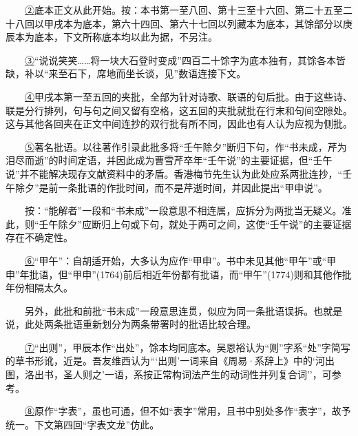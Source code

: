 　　{\hyperref[lnkback_2_a]{②}底本正文从此开始。按：本书第一至八回、第十三至十六回、第二十五至二十八回以甲戌本为底本，第六十四回、第六十七回以列藏本为底本，其馀部分以庚辰本为底本，下文所称底本均以此为据，不另注。}

　　{\href{../Text/part0005_split_000.html\#navto_3_a}{③}``说说笑笑\ldots{}\ldots{}将一块大石登时变成''四百二十馀字为底本独有，其馀各本皆缺，补以``来至石下，席地而坐长谈，见''数语连接下文。}

　　{\href{../Text/part0005_split_000.html\#navto_4_a}{④}甲戌本第一至五回的夹批，全部为针对诗歌、联语的句后批。由于这些诗、联是分行排列，句与句之间又留有空格，这五回的夹批就批在行末和句间空隙处。这与其他各回夹在正文中间连抄的双行批有所不同，因此也有人认为应视为侧批。}

　　{\href{../Text/part0005_split_000.html\#navto_5_a}{⑤}著名批语。以往著作引录此批多将``壬午除夕''断归下句，作``书未成，芹为泪尽而逝''的时间定语，并因此成为曹雪芹卒年``壬午说''的主要证据，但``壬午说''并不能解决现存文献资料中的矛盾。香港梅节先生认为此处应系两批连抄，``壬午除夕''是前一条批语的作批时间，而不是芹逝时间，并因此提出``甲申说''。}

　　{按：``能解者''一段和``书未成''一段意思不相连属，应拆分为两批当无疑义。准此，则``壬午除夕''应断归上句或下句，就处于两可之间，这使``壬午说''的主要证据存在不确定性。}

　　{\href{../Text/part0005_split_000.html\#navto_6_a}{⑥}``甲午''：自胡适开始，大多认为应作``甲申''。书中未见其他``甲午''或``甲申''年批语，但``甲申''(1764)前后相近年份都有批语，而``甲午''(1774)则和其他作批年份相隔太久。}

　　{另外，此批和前批``书未成''一段意思连贯，似应为同一条批语误拆。也就是说，此处两条批语重新划分为两条带署时的批语比较合理。}

　　{\href{../Text/part0005_split_000.html\#navto_7_a}{⑦}``出则''，甲辰本作``出处''，馀本均同底本。吴恩裕认为``则''字系``处''字简写的草书形讹，近是。吾友维西认为```出则'一词来自《周易·系辞上》中的`河出图，洛出书，圣人则之'一语，系按正常构词法产生的动词性并列复合词''，可参考。}

　　{\href{../Text/part0005_split_000.html\#navto_8_a}{⑧}原作``字表''，虽也可通，但不如``表字''常用，且书中别处多作``表字''，故予统一。下文第四回``字表文龙''仿此。}
